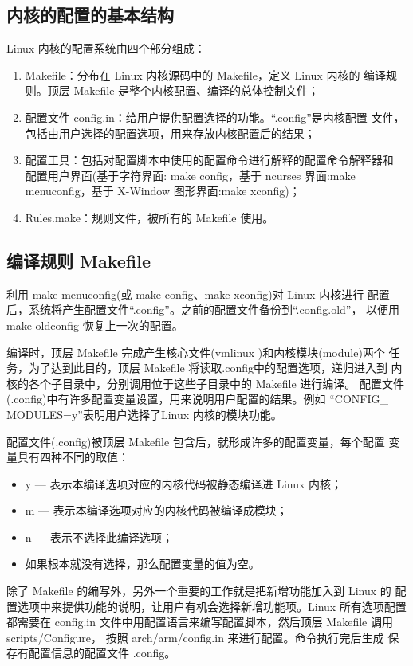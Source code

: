 \subsection{内核的配置的基本结构}
	Linux 内核的配置系统由四个部分组成：
\begin{enumerate}\itemsep=-3pt
  \item Makefile：分布在 Linux 内核源码中的 Makefile，定义 Linux 内核的
		编译规则。顶层 Makefile 是整个内核配置、编译的总体控制文件；
  \item 配置文件 config.in：给用户提供配置选择的功能。``.config''是内核配置
		文件，包括由用户选择的配置选项，用来存放内核配置后的结果；
  \item 配置工具：包括对配置脚本中使用的配置命令进行解释的配置命令解释器和
		配置用户界面(基于字符界面: make config，基于 ncurses 界面:make 
		menuconfig，基于 X-Window 图形界面:make xconfig)；
  \item Rules.make：规则文件，被所有的 Makefile 使用。
\end{enumerate}
\subsection{编译规则 Makefile}
	利用 make menuconfig(或 make config、make xconfig)对 Linux 内核进行
配置后，系统将产生配置文件``.config''。之前的配置文件备份到``.config.old''，
以便用 make oldconfig 恢复上一次的配置。

	编译时，顶层 Makefile 完成产生核心文件(vmlinux )和内核模块(module)两个
任务，为了达到此目的，顶层 Makefile 将读取.config中的配置选项，递归进入到
内核的各个子目录中，分别调用位于这些子目录中的 Makefile 进行编译。
配置文件(.config)中有许多配置变量设置，用来说明用户配置的结果。例如
``CONFIG\_ MODULES=y''表明用户选择了Linux 内核的模块功能。

	配置文件(.config)被顶层 Makefile 包含后，就形成许多的配置变量，每个配置
变量具有四种不同的取值：
\begin{itemize}\itemsep=-3pt
  \item y --- 表示本编译选项对应的内核代码被静态编译进 Linux 内核；
  \item m --- 表示本编译选项对应的内核代码被编译成模块；
  \item n --- 表示不选择此编译选项；
  \item 如果根本就没有选择，那么配置变量的值为空。
\end{itemize}

	除了 Makefile 的编写外，另外一个重要的工作就是把新增功能加入到 Linux 的
配置选项中来提供功能的说明，让用户有机会选择新增功能项。Linux 所有选项配置
都需要在 config.in 文件中用配置语言来编写配置脚本，然后顶层 Makefile 调用
scripts/Configure， 按照 arch/arm/config.in 来进行配置。命令执行完后生成
保存有配置信息的配置文件 .config。

